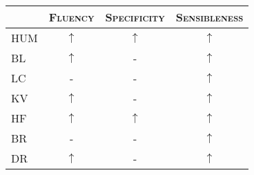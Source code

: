 \begin{tabular}{l|ccc} 
\hline
\textsc{} & \textsc{Fluency} & \textsc{Specificity} & \textsc{Sensibleness} \\
\hline 
\textsc{HUM} & $\uparrow$ & $\uparrow$ & $\uparrow$ \\
\textsc{BL}  & $\uparrow$ & -          & $\uparrow$ \\
\textsc{LC}  & -          & -          & $\uparrow$ \\
\textsc{KV}  & $\uparrow$ & -          & $\uparrow$ \\
\textsc{HF}  & $\uparrow$ & $\uparrow$ & $\uparrow$ \\
\textsc{BR}  & -          & -          & $\uparrow$ \\
\textsc{DR}  & $\uparrow$ & -          & $\uparrow$ \\
\end{tabular}